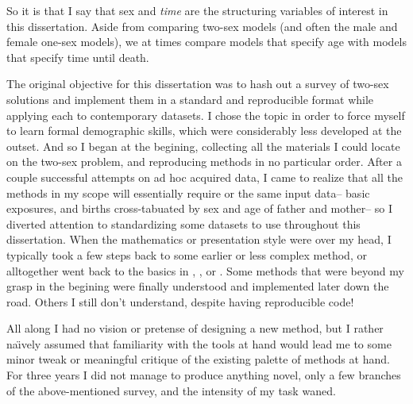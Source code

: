 So it is that I say that sex and \textit{time} are the structuring variables of
interest in this dissertation. Aside from comparing two-sex models (and often the male
and female one-sex models), we at times compare models that
specify age with models that specify time until death. 

The original objective for this dissertation was to hash out a survey of two-sex
solutions and implement them in a standard and reproducible format while
applying each to contemporary datasets. I chose the topic in order to force
myself to learn formal demographic skills, which were considerably less
developed at the outset. And so I began at the begining, collecting
all the materials I could locate on the two-sex problem, and reproducing methods
in no particular order. After a couple successful attempts on ad hoc acquired
data, I came to realize that all the methods in my scope will essentially
require or the same input data-- basic exposures, and births cross-tabuated by
sex and age of father and mother-- so I diverted attention to standardizing some
datasets to use throughout this dissertation. When the mathematics or
presentation style were over my head, I typically took a few steps back to some 
earlier or less complex method, or alltogether went back to the basics 
in \citet{sharpe1911problem}, \citet{kuczynski1932fertility}, \citet{coale1972growth} 
or \citet{caswell2001matrix}. Some methods that were beyond my grasp in the 
begining \citep[e.g.][]{mitra1978derivation} were finally understood and implemented later down the road. 
Others I still don't understand\cite[e.g.][]{choo2006estimating}, despite having
reproducible code!

All along I had no vision or pretense of designing a new method, but I rather
na\"{\i}vely assumed that familiarity with the tools at hand would lead me to
some minor tweak or meaningful critique of the existing palette of methods at
hand. For three years I did not manage to produce anything novel, only a few
branches of the above-mentioned survey, and the intensity of my task waned.


